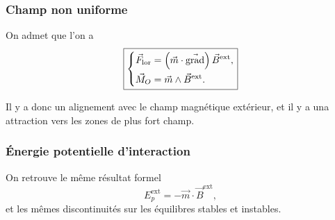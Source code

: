 \subsubsection{Champ non uniforme}
On admet que l'on a 
\begin{equation}
    \boxed{
        \left\lbrace
    \begin{aligned}
        \vec{F}_{\mathrm{lor}}&=\left(\vec{m}\cdot\vec{\mathrm{grad}}\right)\vec{B}^{\mathrm{ext}},\\
        \vec{M}_O&=\vec{m}\wedge\vec{B}^{\mathrm{ext}}.
    \end{aligned}
    \right.}
\end{equation}

Il y a donc un alignement avec le champ magnétique extérieur, et il y a una attraction vers les zones de plus fort champ.

\subsubsection{Énergie potentielle d'interaction}

On retrouve le même résultat formel
\begin{equation}
    \boxed{
        E_p^{\mathrm{ext}}=-\vec{m}\cdot\vec{B}^{\mathrm{ext}},
    }
\end{equation}
et les mêmes discontinuités sur les équilibres stables et instables.